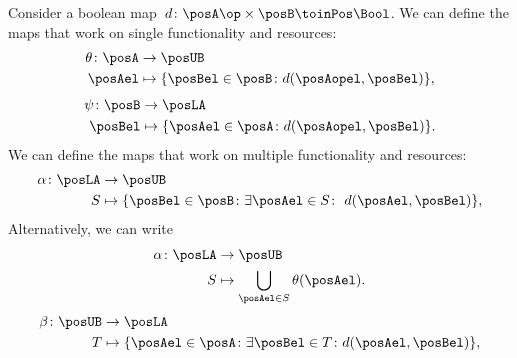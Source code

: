 Consider a boolean map~$d\colon \posA\op \times \posB \toinPos \Bool$.
We can define the maps that work on single functionality and resources:
%
\begin{equation}
    \begin{aligned}
        \theta\colon \posA & \to \posUB                                                  \\
        \posAel            & \mapsto \{\posBel\in \posB \colon d(\posAopel, \posBel) \},
    \end{aligned}
\end{equation}
%
\begin{equation}
    \begin{aligned}
        \psi\colon \posB & \to \posLA                                                  \\
        \posBel          & \mapsto \{\posAel\in \posA \colon d(\posAopel, \posBel) \}.
    \end{aligned}
\end{equation}
We can define the maps that work on multiple functionality and resources:
\begin{equation}
    \label{eq:galoisalfa}
    \begin{aligned}
        \alpha\colon \posLA & \to \posUB                                                                           \\
        S                   & \mapsto \{\posBel\in \posB \colon \exists \posAel\in S\colon \ d(\posAel,\posBel)\},
    \end{aligned}
\end{equation}
Alternatively, we can write
\begin{equation}
    \begin{aligned}
        \alpha \colon \posLA & \to \posUB                                      \\
        S                    & \mapsto \bigcup_{\posAel\in S} \theta(\posAel).
    \end{aligned}
\end{equation}
%
\begin{equation}
    \label{eq:galoisbeta}
    \begin{aligned}
        \beta\colon \posUB & \to \posLA                                                                          \\
        T                  & \mapsto \{\posAel\in \posA  \colon \exists \posBel\in T\colon d(\posAel,\posBel)\},
    \end{aligned}
\end{equation}
